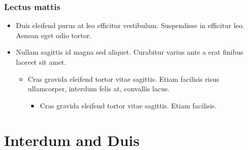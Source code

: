 \documentclass[header]{nosvagor-notes}
\begin{document}
\begin{itemize}
\begin{itemize}
\begin{itemize}
\begin{itemize}
          \end{itemize}
      \end{itemize}
  \end{itemize}

  \subsection{Lectus mattis}
  \begin{itemize}
    \item Duis eleifend purus at leo efficitur vestibulum. Suspendisse in
      efficitur leo. Aenean eget odio tortor.

    \item Nullam sagittis id magna sed aliquet. Curabitur varius ante a erat
      finibus laoreet sit amet.
      \begin{itemize}
        \item Cras gravida eleifend tortor vitae sagittis. Etiam facilisis
          risus ullamcorper, interdum felis at, convallis lacus.
          \begin{itemize}
            \item Cras gravida eleifend tortor vitae sagittis. Etiam facilisis.

          \end{itemize}
      \end{itemize}
  \end{itemize}

\end{itemize}


\chapter{Interdum and Duis}
\end{document}
